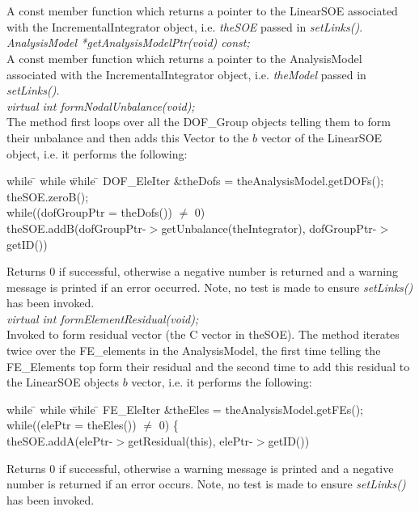   \\
 \\
A const member function which returns a pointer to the LinearSOE
associated with the IncrementalIntegrator object, i.e. {\em theSOE}
passed in {\em setLinks()}. \\

{\em AnalysisModel *getAnalysisModelPtr(void) const;} \\
A const member function which returns a pointer to the AnalysisModel
associated with the IncrementalIntegrator object, i.e. {\em theModel}
passed in {\em setLinks()}. \\


{\em virtual int formNodalUnbalance(void);} \\
The method first
loops over all the DOF\_Group objects telling them to form their
unbalance and then adds this Vector to the $b$ vector of the LinearSOE
object, i.e. it performs the following: \\
\begin{tabbing}
while \= \+ while \= while \= \kill
DOF\_EleIter \&theDofs = theAnalysisModel.getDOFs();\\
theSOE.zeroB();\\
while((dofGroupPtr = theDofs()) $\neq$ 0) \+ \\
theSOE.addB(dofGroupPtr-$>$getUnbalance(theIntegrator),
dofGroupPtr-$>$getID()) \\
\end{tabbing}
\noindent Returns $0$ if successful, otherwise a  negative number is
returned and a warning message is printed if an error occurred. Note,
no test is made to ensure {\em setLinks()} has been invoked.\\


{\em virtual int formElementResidual(void);} \\
Invoked to form residual vector (the C vector in theSOE). The method
iterates twice over the FE\_elements in the AnalysisModel, the first
time telling the FE\_Elements top form their residual and the second
time to add this residual to the LinearSOE objects $b$ vector, i.e. it
performs the following:
\begin{tabbing}
while \= \+ while \= while \= \kill
FE\_EleIter \&theEles = theAnalysisModel.getFEs();\\
while((elePtr = theEles()) $\neq$ 0) \{ \+ \\
theSOE.addA(elePtr-$>$getResidual(this), elePtr-$>$getID()) \+ \\ 
\end{tabbing}
\noindent Returns $0$ if successful, otherwise a warning message is
printed and a negative number is returned if an error occurs. Note, no
test is made to ensure {\em setLinks()} has been invoked.\\




